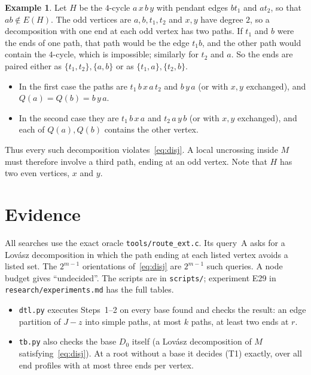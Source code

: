 \documentclass[11pt]{amsart}
\theoremstyle{definition}
\newtheorem{example}[theorem]{Example}
\begin{document}
\begin{example}\label{ex:guard}
Let $H$ be the $4$-cycle $a\,x\,b\,y$ with pendant edges $bt_1$ and $at_2$, so that $ab\notin E(H)$. The
odd vertices are $a,b,t_1,t_2$ and $x,y$ have degree $2$, so a decomposition with one end at each odd
vertex has two paths. If $t_1$ and $b$ were the ends of one path, that path would be the edge $t_1b$,
and the other path would contain the $4$-cycle, which is impossible; similarly for $t_2$ and $a$. So
the ends are paired either as $\{t_1,t_2\},\{a,b\}$ or as $\{t_1,a\},\{t_2,b\}$.
\begin{itemize}[leftmargin=*]
\item In the first case the paths are $t_1\,b\,x\,a\,t_2$ and $b\,y\,a$ (or with $x,y$ exchanged), and
$Q(a)=Q(b)=b\,y\,a$.
\item In the second case they are $t_1\,b\,x\,a$ and $t_2\,a\,y\,b$ (or with $x,y$ exchanged), and each
of $Q(a),Q(b)$ contains the other vertex.
\end{itemize}
Thus every such decomposition violates~\eqref{eq:disj}. A local uncrossing inside $M$ must therefore
involve a third path, ending at an odd vertex. Note that $H$ has two even vertices, $x$ and $y$.
\end{example}

\section{Evidence}\label{sec:evidence}

All searches use the exact oracle \texttt{tools/route\_ext.c}. Its query~A asks for a Lov\'asz
decomposition in which the path ending at each listed vertex avoids a listed set. The $2^{m-1}$
orientations of~\eqref{eq:disj} are $2^{m-1}$ such queries. A node budget gives ``undecided''.
The scripts are in \texttt{scripts/}; experiment E29 in \texttt{research/experiments.md} has the full
tables.
\begin{itemize}[leftmargin=*]
\item \texttt{dtl.py} executes Steps~1--2 on every base found and checks the result: an edge
partition of $J-z$ into simple paths, at most $k$ paths, at least two ends at $r$.
\item \texttt{tb.py} also checks the base $D_0$ itself (a Lov\'asz decomposition of $M$
satisfying~\eqref{eq:disj}). At a root without a base it decides (T1) exactly, over all end profiles
with at most three ends per vertex.
\end{itemize}
\end{document}
